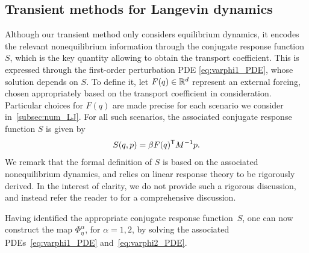 %
\subsection{Transient methods for Langevin dynamics}
\label{subsec:num_lang}
%
%
Although our transient method only considers equilibrium dynamics, it encodes the relevant nonequilibrium information through the conjugate  response function $S$, which is the key quantity allowing to obtain the transport coefficient. This is expressed through the first-order perturbation PDE \eqref{eq:varphi1_PDE}, whose solution depends on $S$. To define it, let $F(q) \in \mathbb{R}^{d}$ represent an external forcing, chosen appropriately based on the transport coefficient in consideration. Particular choices for $F(q)$ are made precise for each scenario we consider in~\cref{subsec:num_LJ}. For all such scenarios, the associated conjugate response function $S$ is given by
%
\begin{equation}
    S(q,p) = \beta F(q)^\mathsf T M^{-1} p.
    \label{eq:conj_res}
\end{equation}
%
We remark that the formal definition of $S$ is based on the associated nonequilibrium dynamics, and relies on linear response theory to be rigorously derived. In the interest of clarity, we do not provide such a rigorous discussion, and instead refer the reader to \cite[Section 5.2.3]{acta_numerica2016} for a comprehensive discussion.

Having identified the appropriate conjugate response function~$S$, one can now construct the map $\Phi_\eta^\alpha$, for $\alpha=1,2$, by solving the associated PDEs~\eqref{eq:varphi1_PDE} and~\eqref{eq:varphi2_PDE}. 
%
%

